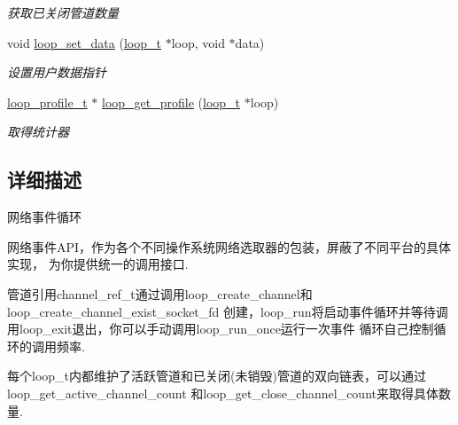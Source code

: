 \begin{DoxyCompactItemize}
\begin{DoxyCompactList}\small\item\em 获取已关闭管道数量 \end{DoxyCompactList}\item 
void \hyperlink{a00105_ga480fadf19a49cb27354866e06500a03c_ga480fadf19a49cb27354866e06500a03c}{loop\+\_\+set\+\_\+data} (\hyperlink{a00051_a9c3ad1cd2de83e09f3a7b59fa82c94ee_a9c3ad1cd2de83e09f3a7b59fa82c94ee}{loop\+\_\+t} $\ast$loop, void $\ast$data)
\begin{DoxyCompactList}\small\item\em 设置用户数据指针 \end{DoxyCompactList}\item 
\hyperlink{a00051_ad060e1396346d2f5db1ec0597376a107_ad060e1396346d2f5db1ec0597376a107}{loop\+\_\+profile\+\_\+t} $\ast$ \hyperlink{a00105_gad3f87700814d56a619ab5517b1f5fe5b_gad3f87700814d56a619ab5517b1f5fe5b}{loop\+\_\+get\+\_\+profile} (\hyperlink{a00051_a9c3ad1cd2de83e09f3a7b59fa82c94ee_a9c3ad1cd2de83e09f3a7b59fa82c94ee}{loop\+\_\+t} $\ast$loop)
\begin{DoxyCompactList}\small\item\em 取得统计器 \end{DoxyCompactList}\end{DoxyCompactItemize}


\subsection{详细描述}
网络事件循环 


\begin{DoxyPre}
网络事件API，作为各个不同操作系统网络选取器的包装，屏蔽了不同平台的具体实现，
为你提供统一的调用接口.\end{DoxyPre}



\begin{DoxyPre}管道引用channel\_ref\_t通过调用loop\_create\_channel和loop\_create\_channel\_exist\_socket\_fd
创建，loop\_run将启动事件循环并等待调用loop\_exit退出，你可以手动调用loop\_run\_once运行一次事件
循环自己控制循环的调用频率.\end{DoxyPre}



\begin{DoxyPre}每个loop\_t内都维护了活跃管道和已关闭(未销毁)管道的双向链表，可以通过loop\_get\_active\_channel\_count
和loop\_get\_close\_channel\_count来取得具体数量.\end{DoxyPre}



